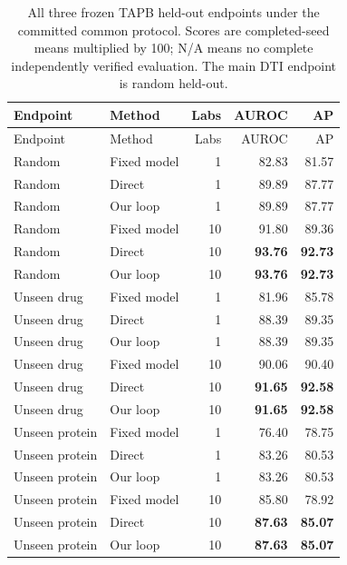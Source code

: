 \begin{longtable}{llrrr}
\caption{All three frozen TAPB held-out endpoints under the committed common protocol. Scores are completed-seed means multiplied by 100; N/A means no complete independently verified evaluation. The main DTI endpoint is random held-out.}\label{tab:strong-dti-endpoints}\\
\toprule Endpoint & Method & Labs & AUROC & AP \\ \midrule\endfirsthead
\toprule Endpoint & Method & Labs & AUROC & AP \\ \midrule\endhead
Random & Fixed model & 1 & 82.83 & 81.57 \\
Random & Direct & 1 & 89.89 & 87.77 \\
Random & Our loop & 1 & 89.89 & 87.77 \\
Random & Fixed model & 10 & 91.80 & 89.36 \\
Random & Direct & 10 & \textbf{93.76} & \textbf{92.73} \\
Random & Our loop & 10 & \textbf{93.76} & \textbf{92.73} \\
\midrule
Unseen drug & Fixed model & 1 & 81.96 & 85.78 \\
Unseen drug & Direct & 1 & 88.39 & 89.35 \\
Unseen drug & Our loop & 1 & 88.39 & 89.35 \\
Unseen drug & Fixed model & 10 & 90.06 & 90.40 \\
Unseen drug & Direct & 10 & \textbf{91.65} & \textbf{92.58} \\
Unseen drug & Our loop & 10 & \textbf{91.65} & \textbf{92.58} \\
\midrule
Unseen protein & Fixed model & 1 & 76.40 & 78.75 \\
Unseen protein & Direct & 1 & 83.26 & 80.53 \\
Unseen protein & Our loop & 1 & 83.26 & 80.53 \\
Unseen protein & Fixed model & 10 & 85.80 & 78.92 \\
Unseen protein & Direct & 10 & \textbf{87.63} & \textbf{85.07} \\
Unseen protein & Our loop & 10 & \textbf{87.63} & \textbf{85.07} \\
\midrule
\bottomrule
\end{longtable}
